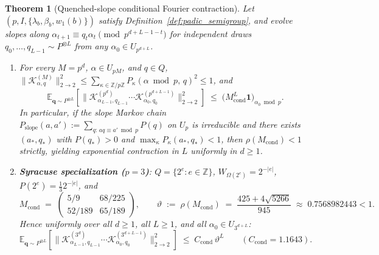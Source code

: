 \documentclass[11pt,a4paper]{article}
\numberwithin{equation}{section}
\newtheorem{theorem}{Theorem}[section]
\theoremstyle{definition}
\theoremstyle{remark}
\newcommand{\Z}{\mathbb{Z}}
\newcommand{\E}{\mathbb{E}}
\newcommand{\cK}{\mathcal{K}}
\begin{document}
\begin{theorem}[Quenched-slope conditional Fourier contraction]\label{thm:cond_contraction}
Let $(p, I, \{\lambda_b, \beta_b, w_1(b)\})$ satisfy Definition~\ref{def:padic_semigroup}, and evolve slopes along $\alpha_{t+1} \equiv q_t \alpha_t \pmod{p^{d+L-1-t}}$ for independent draws $q_0, \dots, q_{L-1} \sim P^{\otimes L}$ from any $\alpha_0 \in U_{p^{d+L}}$.
\begin{enumerate}[label=(\arabic*)]
\item For every $M = p^d$, $\alpha \in U_{pM}$, and $q \in Q$, $\|\cK_{\alpha, q}^{(M)}\|_{2\to 2}^2 \le \sum_{\kappa \in \Z/p\Z} P_\kappa(\alpha \bmod p,\, q)^2 \le 1$, and
\[
\E_{\boldsymbol{q} \sim P^{\otimes L}}\!\left[\bigl\|\cK_{\alpha_{L-1}, q_{L-1}}^{(p^d)} \cdots \cK_{\alpha_0, q_0}^{(p^{d+L-1})}\bigr\|_{2\to 2}^2\right] \;\le\; \bigl(M_{\mathrm{cond}}^L \mathbf{1}\bigr)_{\alpha_0 \bmod p}.
\]
In particular, if the slope Markov chain $P_{\mathrm{slope}}(a, a') := \sum_{q:\, aq \equiv a' \bmod p} P(q)$ on $U_p$ is irreducible and there exists $(a_*, q_*)$ with $P(q_*) > 0$ and $\max_\kappa P_\kappa(a_*, q_*) < 1$, then $\rho(M_{\mathrm{cond}}) < 1$ strictly, yielding exponential contraction in $L$ uniformly in $d \ge 1$.
\item \textbf{Syracuse specialization ($p = 3$)}: $Q = \{2^e : e \in \Z\}$, $W_{\Omega(2^e)} = 2^{-|e|}$, $P(2^e) = \frac{1}{3} 2^{-|e|}$, and
\[
M_{\mathrm{cond}} \;=\; \begin{pmatrix} 5/9 & 68/225 \\[4pt] 52/189 & 65/189 \end{pmatrix}, \qquad \vartheta \;:=\; \rho(M_{\mathrm{cond}}) \;=\; \frac{425 + 4\sqrt{5266}}{945} \;\approx\; 0.7568982443 < 1.
\]
Hence uniformly over all $d \ge 1$, all $L \ge 1$, and all $\alpha_0 \in U_{3^{d+L}}$:
\[
\E_{\boldsymbol{q} \sim P^{\otimes L}}\!\left[\bigl\|\cK_{\alpha_{L-1}, q_{L-1}}^{(3^d)} \cdots \cK_{\alpha_0, q_0}^{(3^{d+L-1})}\bigr\|_{2\to 2}^2\right] \;\le\; C_{\mathrm{cond}}\,\vartheta^L \qquad (C_{\mathrm{cond}} = 1.1643).
\]
\end{enumerate}
\end{theorem}
\end{document}
